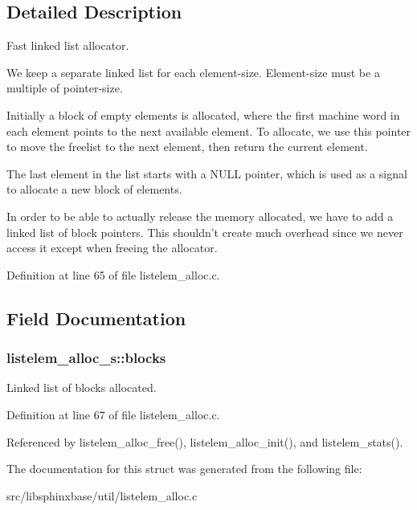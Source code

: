 \subsection{Detailed Description}
Fast linked list allocator. 

We keep a separate linked list for each element-size. Element-size must be a multiple of pointer-size.

Initially a block of empty elements is allocated, where the first machine word in each element points to the next available element. To allocate, we use this pointer to move the freelist to the next element, then return the current element.

The last element in the list starts with a NULL pointer, which is used as a signal to allocate a new block of elements.

In order to be able to actually release the memory allocated, we have to add a linked list of block pointers. This shouldn't create much overhead since we never access it except when freeing the allocator. 

Definition at line 65 of file listelem\_\-alloc.c.

\subsection{Field Documentation}
\subsubsection[{blocks}]{ {\bf listelem\_\-alloc\_\-s::blocks}}\label{structlistelem__alloc__s_1216578b1d5416dc0a03c802cfa1def9}


Linked list of blocks allocated. 



Definition at line 67 of file listelem\_\-alloc.c.

Referenced by listelem\_\-alloc\_\-free(), listelem\_\-alloc\_\-init(), and listelem\_\-stats().

The documentation for this struct was generated from the following file:\begin{CompactItemize}
\item 
src/libsphinxbase/util/listelem\_\-alloc.c\end{CompactItemize}
